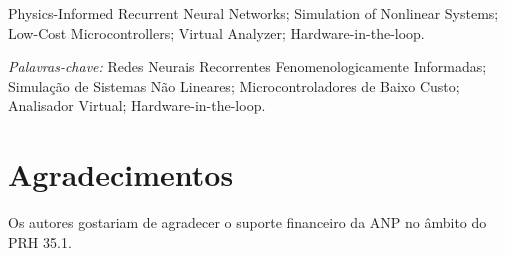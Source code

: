 \documentclass[a4paper]{ifacconf}
\begin{document}
\begin{frontmatter}

  \begin{keyword}
    Physics-Informed Recurrent Neural Networks; Simulation of Nonlinear Systems; Low-Cost Microcontrollers; Virtual Analyzer; Hardware-in-the-loop.

    \vskip 1mm%
    {\noindent\it Palavras-chave:} Redes Neurais Recorrentes Fenomenologicamente Informadas; Simulação de Sistemas Não Lineares; Microcontroladores de Baixo Custo; Analisador Virtual; Hardware-in-the-loop.
  \end{keyword}

\end{frontmatter}







\section*{Agradecimentos}
Os autores gostariam de agradecer o suporte financeiro da ANP no âmbito do PRH 35.1.


\end{document}

